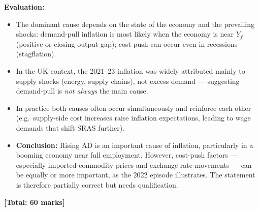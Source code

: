 \documentclass[12pt,a4paper]{article}
\begin{document}
\vspace{0.3em}
\textbf{Evaluation:}
\begin{itemize}
    \item The dominant cause depends on the state of the economy and the prevailing shocks: demand-pull inflation is most likely when the economy is near $Y_f$ (positive or closing output gap); cost-push can occur even in recessions (stagflation).
    \item In the UK context, the 2021--23 inflation was widely attributed mainly to supply shocks (energy, supply chains), not excess demand --- suggesting demand-pull is \textit{not always} the main cause.
    \item In practice both causes often occur simultaneously and reinforce each other (e.g.\ supply-side cost increases raise inflation expectations, leading to wage demands that shift SRAS further).
    \item \textbf{Conclusion:} Rising AD is an important cause of inflation, particularly in a booming economy near full employment. However, cost-push factors --- especially imported commodity prices and exchange rate movements --- can be equally or more important, as the 2022 episode illustrates. The statement is therefore partially correct but needs qualification.
\end{itemize}

\vfill
\begin{center}
    \textbf{[Total: 60 marks]}
\end{center}
\end{document}
